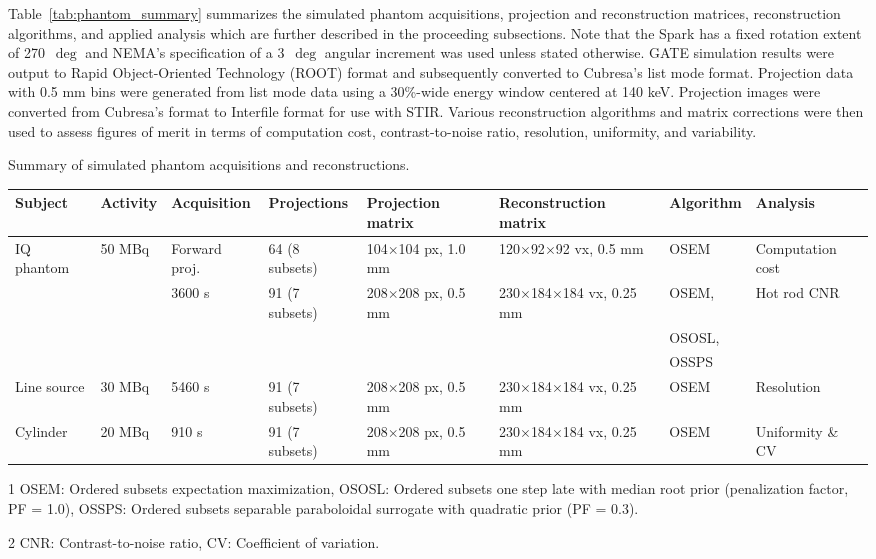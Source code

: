 \documentclass[utf8]{FrontiersinHarvard} %
\begin{document}
Table~\ref{tab:phantom_summary} summarizes the simulated phantom acquisitions, projection and reconstruction matrices, reconstruction algorithms, and applied analysis which are further described in the proceeding subsections. Note that the Spark has a fixed rotation extent of 270~$\deg$ and NEMA's specification of a 3~$\deg$ angular increment was used unless stated otherwise. GATE simulation results were output to Rapid Object-Oriented Technology (ROOT) format and subsequently converted to Cubresa's list mode format. Projection data with 0.5 mm bins were generated from list mode data using a 30\%-wide energy window centered at 140 keV. Projection images were converted from Cubresa's format to Interfile format for use with STIR. Various reconstruction algorithms and matrix corrections were then used to assess figures of merit in terms of computation cost, contrast-to-noise ratio, resolution, uniformity, and variability.

\begin{threeparttable}[h!]
\caption{Summary of simulated phantom acquisitions and reconstructions.\label{tab:phantom_summary}}
\footnotesize
\begin{tabular}{l l l l l l l l}
	\hline
	Subject & Activity & Acquisition & Projections & Projection matrix & Reconstruction matrix & Algorithm\footnotemark[1] & Analysis\footnotemark[2] \\ \hline
	
	IQ phantom & 50 MBq & Forward proj. & 64 (8 subsets) & 104$\times$104 px, 1.0 mm & 120$\times$92$\times$92 vx, 0.5 mm & OSEM & Computation cost	\\
	 & & 3600 s & 91 (7 subsets) & 208$\times$208 px, 0.5 mm & 230$\times$184$\times$184 vx, 0.25 mm & OSEM, & Hot rod $\mathrm{CNR}$ \\
	 & & & & & & OSOSL,	\\
	 & & & & & & OSSPS	\\
	
	Line source & 30 MBq & 5460 s & 91 (7 subsets) & 208$\times$208 px, 0.5 mm & 230$\times$184$\times$184 vx, 0.25 mm & OSEM & Resolution	\\
	
	
	Cylinder & 20 MBq & 910 s & 91 (7 subsets) & 208$\times$208 px, 0.5 mm & 230$\times$184$\times$184 vx, 0.25 mm & OSEM & Uniformity \& $\mathrm{CV}$	\\ \hline
	
\end{tabular}
\begin{tablenotes}
	\item[1] OSEM: Ordered subsets expectation maximization, OSOSL: Ordered subsets one step late with median root prior (penalization factor, PF = 1.0), OSSPS: Ordered subsets separable paraboloidal surrogate with quadratic prior (PF = 0.3).%
	\item[2] $\mathrm{CNR}$: Contrast-to-noise ratio, $\mathrm{CV}$: Coefficient of variation.
\end{tablenotes}
\end{threeparttable}
\end{document}
